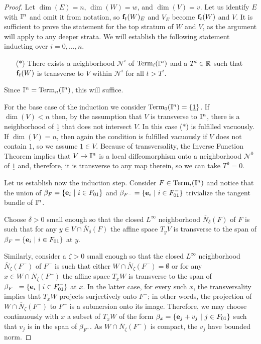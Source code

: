 \begin{proof}
	Let $\dim(E) = n$, $\dim(W) = w$, and $\dim(V) = v$.
	Let us identify $E$ with $\mathbb{I}^n$ and omit it from notation, so $\mathbf{f}_t(W)_E$ and $V_E$ become $\mathbf{f}_t(W)$ and $V$.
	It is sufficient to prove the statement for the top stratum of $W$ and $V$, as the argument will apply to any deeper strata.
	We will establish the following statement inducting over $i = 0, \dots, n$.
	\begin{itemize}	
		\item[($\ast$)] There exists a neighborhood $\mathcal N^i$ of ${\rm Term}_{i}(\mathbb{I}^n)$ and a $T^i \in \mathbb{R}$ such that $\mathbf{f}_t(W)$ is transverse to $V$ within $\mathcal N^i$ for all $t > T^i$.	
	\end{itemize}
	Since $\mathbb{I}^n = {\rm Term}_{n}(\mathbb{I}^n)$, this will suffice.
	
	For the base case of the induction we consider ${\rm Term}_0(\mathbb{I}^n) = \{\underline{1}\}$.
	If $\dim(V) < n$ then, by the assumption that $V$ is transverse to $\mathbb{I}^n$, there is a neighborhood of $\underline{1}$ that does not intersect $V$.	
	In this case ($\ast$) is fulfilled vacuously.	
	If $\dim(V) = n$, then again the condition is fulfilled vacuously if $V$ does not contain $\underline{1}$, so we assume $\underline{1} \in V$.	
	Because of transversality, the Inverse Function Theorem implies that $V \to \mathbb{I}^n$ is a local diffeomorphism onto a neighborhood $\mathcal N^0$ of $\underline{1}$ and, therefore, it is transverse to any map therein, so we can take $T^0 = 0$.
	
	Let us establish now the induction step.
	Consider $F \in {\rm Term}_{i}(\mathbb{I}^n)$ and notice that the union of $\beta_F = \{\mathbf{e}_i\ |\ i \in F_{01}\}$ and $\beta_{F^-} = \{\e_i\ |\ i \in F^-_{01}\}$ trivialize the tangent bundle of $\mathbb{I}^n$.
	
	Choose $\delta > 0$ small enough so that the closed $L^\infty$ neighborhood $\overline N_\delta(F)$ of $F$ is such that for any $y \in V \cap \overline N_\delta(F)$ the affine space $T_yV$ is transverse to the span of $\beta_F = \{\mathbf{e}_i\ |\ i \in F_{01}\}$ at $y$.
	
	Similarly, consider a $\zeta > 0$ small enough so that the closed $L^\infty$ neighborhood $\overline N_\zeta(F^-)$ of $F^-$ is such that either $W \cap \overline N_\zeta(F^-) = \emptyset$ or for any $x \in W \cap \overline N_\zeta(F^-)$ the affine space $T_xW$ is transverse to the span of $\beta_{F^-} = \{\e_i\ |\ i \in F^-_{01}\}$ at $x$.
	In the latter case, for every such $x$, the transversality implies that $T_xW$ projects surjectively onto $F^-$; in other words, the projection of $W \cap \overline N_\zeta(F^-)$ to $F^-$ is a submersion onto its image. Therefore, we may choose continuously with $x$ a subset of $T_xW$ of the form $\beta_x = \{\mathbf{e}_j + v_j\ |\ j \in F_{01}\}$ such that $v_j$ is in the span of $\beta_{F^-}$.
	As $W \cap \overline N_\zeta(F^-)$ is compact, the $v_j$ have bounded norm.
	

\end{proof}
